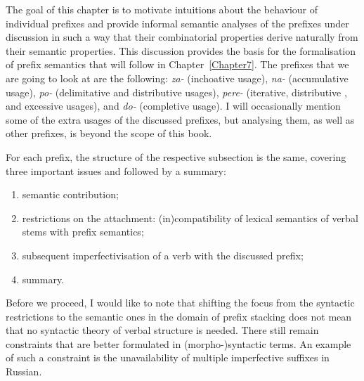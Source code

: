 The goal of this chapter is to motivate intuitions about the behaviour of individual prefixes and provide informal semantic analyses of the prefixes under discussion in such a way that their combinatorial properties derive naturally from their semantic properties. 
This discussion provides the basis for the formalisation of prefix semantics that will follow in Chapter~\ref{Chapter7}. The prefixes that we are going to look at are the following: \textit{za-}   (inchoative  usage), \textit{na-}   (accumulative  usage), \textit{po-}   (delimitative  and distributive  usages), \textit{pere-}   (iterative, distributive , and excessive  usages), and \textit{do-}   (completive  usage). I will occasionally mention some of the extra usages of the discussed prefixes, but analysing them, as well as other prefixes, is beyond the scope of this book.

For each prefix, the structure of the respective subsection is the same, covering three important issues and followed by a summary:
\begin{enumerate}
\item semantic contribution;
\item restrictions on the attachment: (in)compatibility of lexical semantics of verbal stems with prefix semantics;
\item subsequent imperfectivisation of a verb with the discussed prefix;
\item summary.
\end{enumerate}


Before we proceed, I would like to note that shifting the focus from the syntactic restrictions to the semantic ones in the domain of prefix stacking  does not mean that no syntactic theory  of verbal structure is needed. There still remain constraints that are better formulated in (morpho-)syntactic terms. An example of such a constraint is the unavailability of multiple imperfective suffixes in Russian. 


